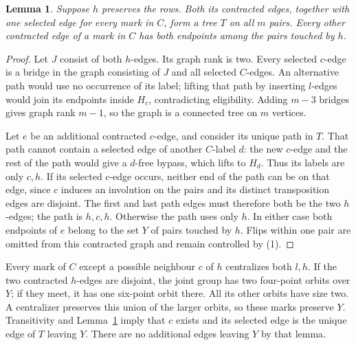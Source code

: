 \documentclass[11pt,a4paper]{article}
\newtheorem{lemma}{Lemma}
\begin{document}
\begin{lemma}\label{tree}
Suppose $h$ preserves the rows. Both its contracted edges, together
with one selected edge for every mark in $C$, form a tree $T$ on
all $m$ pairs. Every other contracted edge of a mark in $C$ has
both endpoints among the pairs touched by $h$.
\end{lemma}
\begin{proof}
Let $J$ consist of both $h$-edges. Its graph rank is two. Every
selected $c$-edge is a bridge in the graph consisting of $J$ and
all selected $C$-edges. An alternative path would use no occurrence
of its label; lifting that path by inserting $l$-edges would join
its endpoints inside $H_c$, contradicting eligibility. Adding
$m-3$ bridges gives graph rank $m-1$, so the graph is a connected
tree on $m$ vertices.

Let $e$ be an additional contracted $c$-edge, and consider its unique
path in $T$. That path cannot contain a selected edge of another
$C$-label $d$: the new $c$-edge and the rest of the path would give
a $d$-free bypass, which lifts to $H_d$. Thus its labels are only
$c,h$. If its selected $c$-edge occurs, neither end of the path
can be on that edge, since $c$ induces an involution on the pairs
and its distinct transposition edges are disjoint. The first and
last path edges must therefore both be the two $h$-edges; the
path is $h,c,h$. Otherwise the path uses only $h$. In either case
both endpoints of $e$ belong to the set $Y$ of pairs touched by
$h$. Flips within one pair are omitted from this contracted graph
and remain controlled by (1).
\end{proof}

Every mark of $C$ except a possible neighbour $c$ of $h$ centralizes
both $l,h$. If the two contracted $h$-edges are disjoint, the joint
group has two four-point orbits over $Y$; if they meet, it has one
six-point orbit there. All its other orbits have size two. A
centralizer preserves this union of the larger orbits, so these
marks preserve $Y$. Transitivity and Lemma~\ref{tree} imply that
$c$ exists and its selected edge is the unique edge of $T$ leaving
$Y$. There are no additional edges leaving $Y$ by that lemma.
\end{document}
